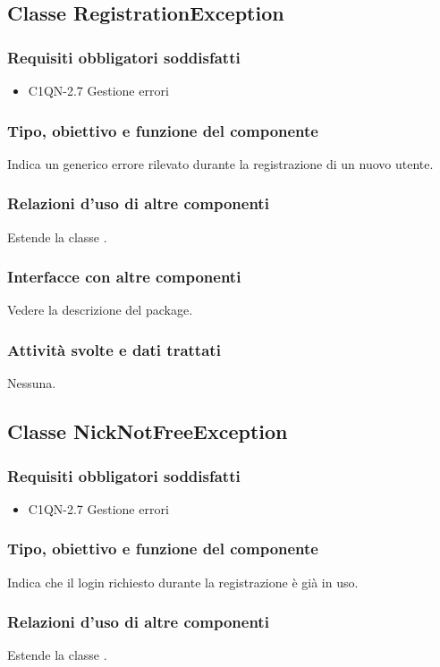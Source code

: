 \subsection{Classe RegistrationException}
\subsubsection*{Requisiti obbligatori soddisfatti}
\begin{itemize}
	\item C1QN-2.7 Gestione errori
\end{itemize}
\subsubsection*{Tipo, obiettivo e funzione del componente}
Indica un generico errore rilevato durante la registrazione di un nuovo utente.
\subsubsection*{Relazioni d'uso di altre componenti}
Estende la classe .
\subsubsection*{Interfacce con altre componenti}
Vedere la descrizione del package.
\subsubsection*{Attivit\`a svolte e dati trattati}
Nessuna.

\subsection{Classe NickNotFreeException}
\subsubsection*{Requisiti obbligatori soddisfatti}
\begin{itemize}
	\item C1QN-2.7 Gestione errori
\end{itemize}
\subsubsection*{Tipo, obiettivo e funzione del componente}
Indica che il login richiesto durante la registrazione \`e gi\`a in uso.
\subsubsection*{Relazioni d'uso di altre componenti}
Estende la classe .
